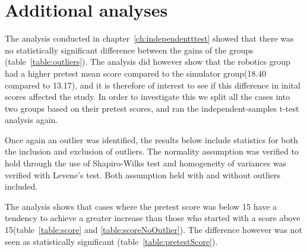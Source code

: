 \chapter{Additional analyses}\label{ch:additionalTests}
The analysis conducted in chapter~\ref{ch:independentttest} showed that there was no statistically significant difference between the gains of the groups (table~\ref{table:outliers}). 
The analysis did however show that the robotics group had a higher pretest mean score compared to the simulator group(18.40 compared to 13.17), and it is therefore of interest to see if this difference in inital scores affected the study.
In order to investigate this we split all the cases into two groups based on their pretest scores, and ran the independent-samples t-test analysis again.

\bigskip\noindent
Once again an outlier was identified, the results below include statistics for both the inclusion and exclusion of outliers. The normality assumption was verified to hold through the use of Shapiro-Wilks test and homogeneity of variances was verified with Levene's test. Both assumption held with and without outliers included.

\bigskip\noindent
The analysis shows that cases where the pretest score was below 15 have a tendency to achieve a greater increase than those who started with a score above 15(table~\ref{table:score} and \ref{table:scoreNoOutlier}). The difference however was not seen as statistically significant (table~\ref{table:pretestScore}).


